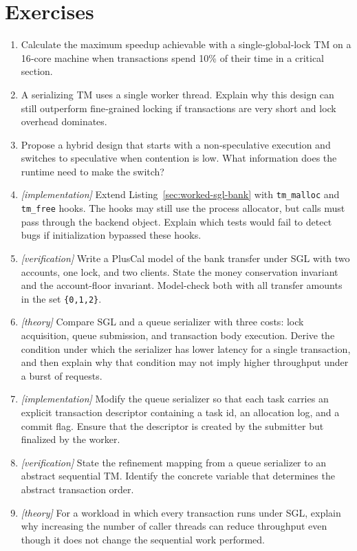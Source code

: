 \section{Exercises}
\begin{enumerate}
    \item Calculate the maximum speedup achievable with a single‑global‑lock TM on a 16‑core machine when transactions spend 10\% of their time in a critical section.
    \item A serializing TM uses a single worker thread. Explain why this design can still outperform fine‑grained locking if transactions are very short and lock overhead dominates.
    \item Propose a hybrid design that starts with a non‑speculative execution and switches to speculative when contention is low. What information does the runtime need to make the switch?
    \item \emph{[implementation]} Extend Listing~\ref{sec:worked-sgl-bank} with \texttt{tm\_malloc} and \texttt{tm\_free} hooks. The hooks may still use the process allocator, but calls must pass through the backend object. Explain which tests would fail to detect bugs if initialization bypassed these hooks.
    \item \emph{[verification]} Write a PlusCal model of the bank transfer under SGL with two accounts, one lock, and two clients. State the money conservation invariant and the account-floor invariant. Model-check both with all transfer amounts in the set \texttt{\{0,1,2\}}.
    \item \emph{[theory]} Compare SGL and a queue serializer with three costs: lock acquisition, queue submission, and transaction body execution. Derive the condition under which the serializer has lower latency for a single transaction, and then explain why that condition may not imply higher throughput under a burst of requests.
    \item \emph{[implementation]} Modify the queue serializer so that each task carries an explicit transaction descriptor containing a task id, an allocation log, and a commit flag. Ensure that the descriptor is created by the submitter but finalized by the worker.
    \item \emph{[verification]} State the refinement mapping from a queue serializer to an abstract sequential TM. Identify the concrete variable that determines the abstract transaction order.
    \item \emph{[theory]} For a workload in which every transaction runs under SGL, explain why increasing the number of caller threads can reduce throughput even though it does not change the sequential work performed.

\end{enumerate}
